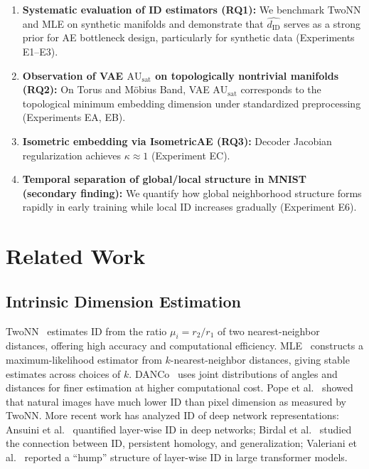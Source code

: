 \documentclass[lettersize,journal]{IEEEtran}
\newcommand{\dID}{d_{\mathrm{ID}}}
\newcommand{\kap}{\kappa}
\newcommand{\AUsat}{\mathrm{AU}_{\mathrm{sat}}}
\begin{document}
\begin{enumerate}
  \item \textbf{Systematic evaluation of ID estimators (RQ1):}
    We benchmark TwoNN and MLE on synthetic manifolds and demonstrate that $\hat{\dID}$ serves as a strong prior for AE bottleneck design, particularly for synthetic data (Experiments E1--E3).
  \item \textbf{Observation of VAE $\AUsat$ on topologically nontrivial manifolds (RQ2):}
    On Torus and M\"{o}bius Band, VAE $\AUsat$ corresponds to the topological minimum embedding dimension under standardized preprocessing (Experiments EA, EB).
  \item \textbf{Isometric embedding via IsometricAE (RQ3):}
    Decoder Jacobian regularization achieves $\kap \approx 1$ (Experiment EC).
  \item \textbf{Temporal separation of global/local structure in MNIST (secondary finding):}
    We quantify how global neighborhood structure forms rapidly in early training while local ID increases gradually (Experiment E6).
\end{enumerate}

\section{Related Work}\label{sec:related}

\subsection{Intrinsic Dimension Estimation}

TwoNN~\cite{facco2017twonn} estimates ID from the ratio $\mu_i = r_2/r_1$ of two nearest-neighbor distances, offering high accuracy and computational efficiency.
MLE~\cite{levina2005mle} constructs a maximum-likelihood estimator from $k$-nearest-neighbor distances, giving stable estimates across choices of $k$.
DANCo~\cite{ceruti2014danco} uses joint distributions of angles and distances for finer estimation at higher computational cost.
Pope et al.~\cite{pope2021intrinsic} showed that natural images have much lower ID than pixel dimension as measured by TwoNN.
More recent work has analyzed ID of deep network representations: Ansuini et al.~\cite{ansuini2019intrinsic} quantified layer-wise ID in deep networks; Birdal et al.~\cite{birdal2021intrinsic} studied the connection between ID, persistent homology, and generalization; Valeriani et al.~\cite{valeriani2023geometry} reported a ``hump'' structure of layer-wise ID in large transformer models.
\end{document}
